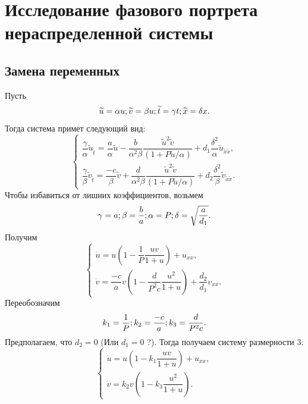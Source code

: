 \documentclass[oneside, final, 12pt]{article}
\begin{document}
\newpage
\section{Исследование фазового портрета нераспределенной системы}						%
\subsection{Замена переменных}
Пусть
\[
    \widetilde{u} = \alpha u;\\
    \widetilde{v} = \beta u;\\
    \widetilde{t} = \gamma t;\\
    \widetilde{x} = \delta x.
\]
Тогда система примет следующий вид:
\[
    \begin{cases}
        \dfrac{\gamma}{\alpha} \widetilde{u}_{\widetilde{t}} =
        \dfrac{a}{\alpha}\widetilde{u}
        - \dfrac{b}{\alpha^2\beta} \dfrac{\widetilde{u}^2\widetilde{v}}{(1 + P\widetilde{u}/\alpha)}
        + d_1\dfrac{\delta^2}{\alpha} \widetilde{u}_{\widetilde{x}\widetilde{x}}, \\

        \dfrac{\gamma}{\beta} \widetilde{v}_{\widetilde{t}} =
        \dfrac{-c}{\beta}\widetilde{v}
        + \dfrac{d}{\alpha^2\beta} \dfrac{\widetilde{u}^2\widetilde{v}}{(1 + P\widetilde{u}/\alpha)}
        + d_2\dfrac{\delta^2}{\beta} \widetilde{v}_{\widetilde{x}\widetilde{x}}.
    \end{cases}
\]
Чтобы избавиться от лишних коэффициентов, возьмем
\[
    \gamma = a;\\
    \beta = \dfrac{b}{a};\\
    \alpha = P;\\
    \delta = \sqrt{\dfrac{a}{d_1}}.
\]
Получим
\[
    \begin{cases}
        \dot{u} = u\left(1 - \dfrac{1}{P} \dfrac{uv}{1 + u}\right)  + u_{xx}, \\
        \dot{v} = \dfrac{-c}{a} v\left(1 - \dfrac{d}{P^{2}c} \dfrac{u^2}{1 + u}\right) + \dfrac{d_2}{d_1}v_{xx}.
    \end{cases}
\]
Переобозначим
\[
    k_1 = \dfrac{1}{P};\\
    k_2 = \dfrac{-c}{a};\\
    k_3 = \dfrac{d}{P^{2}c}.
\]
Предполагаем, что \(d_2 = 0\) (Или \(d_1 = 0\) ?). Тогда получаем систему размерности 3:
\[
    \begin{cases}
        \dot{u} = u\left(1 -  k_1\dfrac{uv}{1 + u}\right)  + u_{xx}, \\
        \dot{v} = k_2 v\left(1 - k_3 \dfrac{u^2}{1 + u}\right).
    \end{cases}
\]
\end{document}
